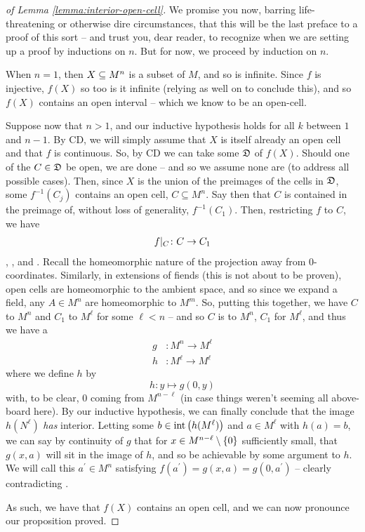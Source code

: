 \begin{proof}[of Lemma \ref{lemma:interior-open-cell}]
  We promise you now, barring life-threatening or otherwise dire circumstances, that this will be the last preface to a proof of this sort -- and trust you, dear reader, to recognize when we are setting up a proof by inductions on $n$. But for now, we proceed by induction on $n$.
  
  When $n = 1$, then $X \subseteq M^{n}$ is a \inhb subset of $M$, and so is infinite. Since $f$ is injective, $f(X)$ so too is it infinite (relying as well on  to conclude this), and so $f(X)$ contains an open interval -- which we know to be an open-cell.
  
  Suppose now that $n > 1$, and our inductive hypothesis holds for all $k$ between $1$ and $n -1$. By CD, we will simply assume that $X$ is itself already an open cell and that $f$ is continuous. So, by CD we can take some \cd $\mathfrak{D}$ of $f(X)$. Should one of the $C \in \mathfrak{D}$ be open, we are done -- and so we assume none are (to address all possible cases). Then, since $X$ is the union of the preimages of the cells in $\mathfrak{D}$, some $f^{-1}(C_j)$ contains an open cell, $C \subseteq M^n$. Say then that $C$ is contained in the preimage of, without loss of generality, $f^{-1}(C_1)$. Then, restricting $f$ to $C$, we have
  \begin{align*}
    f \vert_{C} \colon C \to C_1
  \end{align*}
  \cont, , and \inj. Recall the homeomorphic nature of the projection away from 0-coordinates. Similarly, in extensions of fiends (this is not about to be proven), open cells are homeomorphic to the ambient space, and so since we expand a field, any $A \in M^n$ are  homeomorphic to $M^m$. So, putting this together, we have $C$ \homeom to $M^n$ and $C_1$ \homeom to $M^{\ell}$ for some $\ell < n$ -- and so $C$ is  \homeomic to $M^n$, $C_1$ for $M^{\ell}$, and thus we have a \cont {} \inj 
    \begin{align*}
      g &\colon M^n \to M^{\ell} \\
      h &\colon M^{\ell} \to M^{\ell}
    \end{align*}
    where we define $h$ by
    $$
      h \colon y \mapsto g(0, y)
    $$
    with, to be clear, $0$ coming from $M^{n - \ell}$ (in case things weren't seeming all above-board here). By our inductive hypothesis, we can finally conclude that the image $h(N^{\ell})$ \emph{has} interior. Letting some $b \in \operatorname{int}\left(h(M^{\ell})\right)$ and $a \in M^{\ell}$ with $h(a) = b$, we can say by continuity of $g$ that for $x \in M^{n - \ell} \setminus \{ 0 \}$ sufficiently small, that $g(x, a)$  will sit in the image of $h$, and so be achievable by some argument to $h$. We will call this $a^{\prime} \in M^n$ satisfying $f(a^{\prime}) = g(x, a) = g(0, a^{\prime})$ -- clearly contradicting \injtvty. 
    
    As such, we have that $f(X)$ contains an open cell, and we can now pronounce our proposition proved.
    \smartqed
\end{proof}

